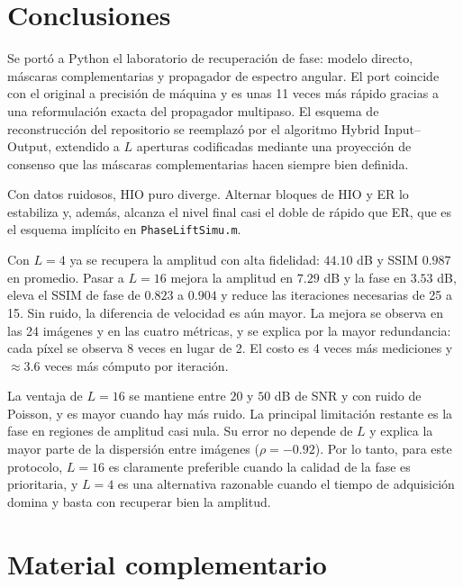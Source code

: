 \documentclass[11pt,a4paper]{article}
\newcommand{\hio}{\textsc{HIO}}
\newcommand{\er}{\textsc{ER}}
\begin{document}
\section{Conclusiones}

Se portó a Python el laboratorio de recuperación de fase: modelo directo, máscaras complementarias y propagador de espectro angular. El port coincide con el original a precisión de máquina y es unas 11 veces más rápido gracias a una reformulación exacta del propagador multipaso. El esquema de reconstrucción del repositorio se reemplazó por el algoritmo Hybrid Input--Output, extendido a $L$ aperturas codificadas mediante una proyección de consenso que las máscaras complementarias hacen siempre bien definida.

Con datos ruidosos, \hio{} puro diverge. Alternar bloques de \hio{} y \er{} lo estabiliza y, además, alcanza el nivel final casi el doble de rápido que \er{}, que es el esquema implícito en \texttt{PhaseLiftSimu.m}.

Con $L=4$ ya se recupera la amplitud con alta fidelidad: $44.10$ dB y SSIM $0.987$ en promedio. Pasar a $L=16$ mejora la amplitud en $7.29$ dB y la fase en $3.53$ dB, eleva el SSIM de fase de $0.823$ a $0.904$ y reduce las iteraciones necesarias de 25 a 15. Sin ruido, la diferencia de velocidad es aún mayor. La mejora se observa en las 24 imágenes y en las cuatro métricas, y se explica por la mayor redundancia: cada píxel se observa 8 veces en lugar de 2. El costo es 4 veces más mediciones y $\approx3.6$ veces más cómputo por iteración.

La ventaja de $L=16$ se mantiene entre $20$ y $50$ dB de SNR y con ruido de Poisson, y es mayor cuando hay más ruido. La principal limitación restante es la fase en regiones de amplitud casi nula. Su error no depende de $L$ y explica la mayor parte de la dispersión entre imágenes ($\rho=-0.92$). Por lo tanto, para este protocolo, $L=16$ es claramente preferible cuando la calidad de la fase es prioritaria, y $L=4$ es una alternativa razonable cuando el tiempo de adquisición domina y basta con recuperar bien la amplitud.

\section{Material complementario}
\end{document}
